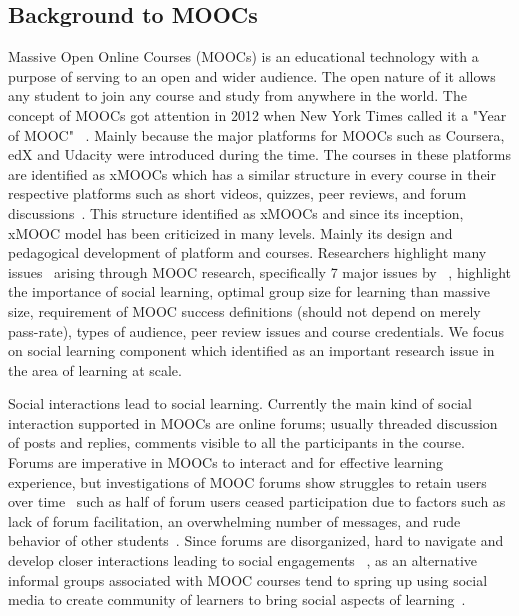 \documentclass[manuscript,screen,review]{acmart}
\begin{document}
\subsection{Background to MOOCs}
Massive Open Online Courses (MOOCs) is an educational technology with a purpose of serving to an open and wider audience. The open nature of it allows any student to join any course and study from anywhere in the world. The concept of MOOCs got attention in 2012 when New York Times called it a "Year of MOOC" ~\cite{pappano2012year}. Mainly because the major platforms for MOOCs such as Coursera, edX and Udacity were introduced during the time. The courses in these platforms are identified as xMOOCs which has a similar structure in every course in their respective platforms such as short videos, quizzes, peer reviews, and forum discussions~\cite{bali2014mooc}. This structure identified as xMOOCs and since its inception, xMOOC model has been criticized in many levels. Mainly its design and pedagogical development of platform and courses. Researchers highlight many issues~\cite{fournier2015mooc,auyeung2015mooc} arising through MOOC research, specifically 7 major issues by ~\cite{scanlon2017learning}, highlight the importance of social learning, optimal group size for learning than massive size, requirement of MOOC success definitions (should not depend on merely pass-rate), types of audience, peer review issues and course credentials. We focus on social learning component which identified as an important research issue in the area of learning at scale.  

Social interactions lead to social learning. Currently the main kind of social interaction supported in MOOCs are online forums; usually threaded discussion of posts and replies, comments visible to all the participants in the course. Forums are imperative in MOOCs to interact and for effective learning experience, but investigations of MOOC forums show struggles to retain users over time~\cite{coetzee2014should} such as half of forum users ceased participation due to factors
such as lack of forum facilitation, an overwhelming number of messages, and rude behavior of other students~\cite{mak2010blogs}. Since forums are disorganized, hard to navigate and develop closer interactions leading to social engagements ~\cite{almatrafi2018systematic}, as an alternative informal groups associated with MOOC courses tend to spring up using social media to create community of learners to bring social aspects of learning~\cite{koutsakas2018exploring}. 
\end{document}

